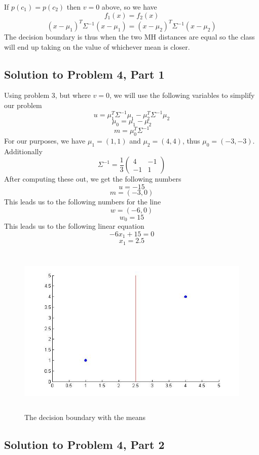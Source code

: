 \documentclass[11pt,psfig]{article}
\begin{document}
If $p(c_1) = p(c_2)$ then $v=0$ above, so we have
\[
f_1(x) = f_2(x)
\]
\[
(x-\mu_1)^T \Sigma^{-1} (x-\mu_1) = (x-\mu_2)^T \Sigma^{-1} (x-\mu_2)
\]
The decision boundary is thus when the two MH distances are equal so the class will end up taking on the value of whichever mean is closer. 

\subsection*{Solution to Problem 4, Part 1}

Using problem 3, but where $v=0$, we will use the following variables to simplify our problem
\[
u = \mu_1^T \Sigma^{-1} \mu_1 - \mu_2^T \Sigma^{-1} \mu_2 
\]
\[
\mu_0 = \mu_1 - \mu_2
\]
\[
m = \mu_0^T \Sigma^{-1}
\]
For our purposes, we have $\mu_1=(1,1)$ and $\mu_2=(4,4)$, thus $\mu_0=(-3,-3)$. Additionally
\[
\Sigma^{-1} = \frac{1}{3} \left( \begin{array}{ccc}
4 & -1 \\
-1 & 1 \end{array} \right)
\]
After computing these out, we get the following numbers
\[
u = -15
\]
\[
m = (-3,0)
\]
This leads us to the following numbers for the line
\[
w = (-6, 0)
\]
\[
w_0 = 15
\]
This leads us to the following linear equation
\[
-6 x_1 + 15 = 0
\]
\[
x_1 = 2.5
\]

\begin{figure}[H]
\centering
\includegraphics[height=3.25in]{plot4_part1.jpg}
\caption{The decision boundary with the means}
\end{figure}

\subsection*{Solution to Problem 4, Part 2}
\end{document}
